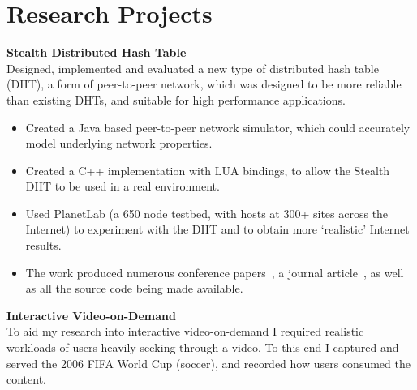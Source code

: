 \documentclass[letterpaper,10pt]{article}
\begin{document}

\nocite{jakeman2009fna,faulkner2009epn,macquire2008acf,brampton2008cew,macquire2008asd,brampton2007cui,rai2007pmp,brampton2006sdh,macquire2006asd,macquire2006pas,brampton2005sdh}

\section{Research Projects}
 \textbf{Stealth Distributed Hash Table}\\
 Designed, implemented and evaluated a new type of distributed hash table (DHT), a form of peer-to-peer network, which was designed to be more reliable than 
existing DHTs, and suitable for high performance applications.

 \begin{itemize}
  \item Created a Java based peer-to-peer network simulator, which could accurately model underlying network properties.
  \item Created a C++ implementation with LUA bindings, to allow the Stealth DHT to be used in a real environment.
  \item Used PlanetLab (a 650 node testbed, with hosts at 300+ sites across the Internet) to experiment with the DHT and to obtain more `realistic' Internet results.
  \item The work produced numerous conference papers~\cite{rai2007pmp, brampton2006sdh, macquire2006asd, macquire2006pas,  brampton2005sdh}, a journal article~\cite{macquire2008asd}, as well as all the source code being made available.
 \end{itemize}
\vspace{1em}

\textbf{Interactive Video-on-Demand}\\
To aid my research into interactive video-on-demand I required realistic workloads of users heavily seeking through a video. 
To this end I captured and served the 2006 FIFA World Cup (soccer), and recorded how users consumed the content.
\end{document}
